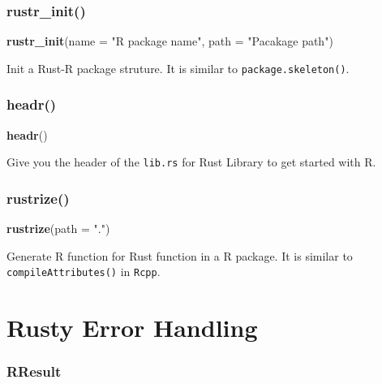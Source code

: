 \documentclass[]{book}
\newenvironment{Shaded}{\begin{snugshade}}{\end{snugshade}}
\newcommand{\KeywordTok}[1]{\textcolor[rgb]{0.13,0.29,0.53}{\textbf{{#1}}}}
\newcommand{\DataTypeTok}[1]{\textcolor[rgb]{0.13,0.29,0.53}{{#1}}}
\newcommand{\StringTok}[1]{\textcolor[rgb]{0.31,0.60,0.02}{{#1}}}
\newcommand{\NormalTok}[1]{{#1}}
\begin{document}
\subsection{rustr\_init()}\label{rustrux5finit}

\begin{Shaded}
\begin{Highlighting}[]
\KeywordTok{rustr_init}\NormalTok{(}\DataTypeTok{name =} \StringTok{"R package name"}\NormalTok{, }\DataTypeTok{path =} \StringTok{"Pacakage path"}\NormalTok{)}
\end{Highlighting}
\end{Shaded}

Init a Rust-R package struture. It is similar to
\texttt{package.skeleton()}.

\subsection{headr()}\label{headr}

\begin{Shaded}
\begin{Highlighting}[]
\KeywordTok{headr}\NormalTok{()}
\end{Highlighting}
\end{Shaded}

Give you the header of the \texttt{lib.rs} for Rust Library to get
started with R.

\subsection{rustrize()}\label{rustrize}

\begin{Shaded}
\begin{Highlighting}[]
\KeywordTok{rustrize}\NormalTok{(}\DataTypeTok{path =} \StringTok{"."}\NormalTok{)}
\end{Highlighting}
\end{Shaded}

Generate R function for Rust function in a R package. It is similar to
\texttt{compileAttributes()} in \texttt{Rcpp}.

\chapter{Rusty Error Handling}\label{rusty-error-handling}

\subsection{RResult}\label{rresult}
\end{document}
